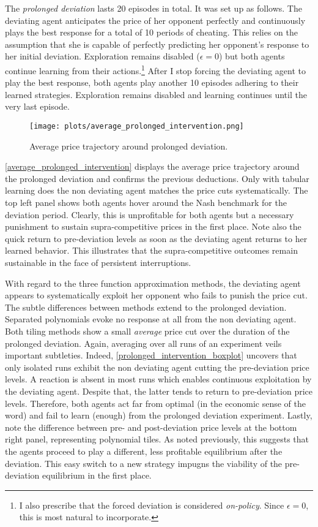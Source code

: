 The \emph{prolonged deviation} lasts 20 episodes in total. It was set up as follows. The deviating agent anticipates the price of her opponent perfectly and continuously plays the best response for a total of 10 periods of cheating. This relies on the assumption that she is capable of perfectly predicting her opponent's response to her initial deviation. Exploration remains disabled ($\epsilon = 0$) but both agents continue learning from their actions.\footnote{I also prescribe that the forced deviation is considered \emph{on-policy}. Since $\epsilon = 0$, this is most natural to incorporate.} After I stop forcing the deviating agent to play the best response, both agents play another 10 episodes adhering to their learned strategies. Exploration remains disabled and learning continues until the very last episode.

\begin{figure}
	\texttt{[image: plots/average\_prolonged\_intervention.png]}
	\caption{Average price trajectory around prolonged deviation.}
	\label{average_prolonged_intervention}
\end{figure}

\autoref{average_prolonged_intervention} displays the average price trajectory around the prolonged deviation and confirms the previous deductions. Only with tabular learning does the non deviating agent matches the price cuts systematically. The top left panel shows both agents hover around the Nash benchmark for the deviation period. Clearly, this is unprofitable for both agents but a necessary punishment to sustain supra-competitive prices in the first place. Note also the quick return to pre-deviation levels as soon as the deviating agent returns to her learned behavior. This illustrates that the supra-competitive outcomes remain sustainable in the face of persistent interruptions.

With regard to the three function approximation methods, the deviating agent appears to systematically exploit her opponent who fails to punish the price cut. The subtle differences between methods extend to the prolonged deviation. Separated polynomials evoke no response at all from the non deviating agent. Both tiling methods show a small \emph{average} price cut over the duration of the prolonged deviation. Again, averaging over all runs of an experiment veils important subtleties. Indeed, \autoref{prolonged_intervention_boxplot} uncovers that only isolated runs exhibit the non deviating agent cutting the pre-deviation price levels. A reaction is absent in most runs which enables continuous exploitation by the deviating agent. Despite that, the latter tends to return to pre-deviation price levels. Therefore, both agents act far from optimal (in the economic sense of the word) and fail to learn (enough) from the prolonged deviation experiment. Lastly, note the difference between pre- and post-deviation price levels at the bottom right panel, representing polynomial tiles. As noted previously, this suggests that the agents proceed to play a different, less profitable equilibrium after the deviation. This easy switch to a new strategy impugns the viability of the pre-deviation equilibrium in the first place.

